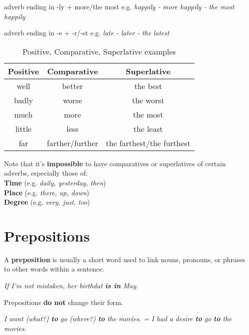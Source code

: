 \documentclass[hidelinks,10pt,a4paper]{article}
\begin{document}
adverb ending in -ly + more/the most
e.g. \textit{happily - more happily - the most happily}

adverb ending in -e + -r/-st
e.g. \textit{late - later - the latest}

\begin{table}[h]
\begin{center}
\begin{tabular}{|c|c|c|}
	\hline
	\textbf{Positive} & \textbf{Comparative} & \textbf{Superlative} \\ \hline
	well & better & the best \\ \hline
	badly & worse & the worst \\ \hline
	much & more & the most \\ \hline
	little & less & the least \\ \hline
	far & farther/further & the farthest/the furthest \\ \hline
\end{tabular}
\end{center}
\caption{Positive, Comparative, Superlative examples} \label{tab:csad2}
\end{table}

Note that it's \textbf{impossible} to have comparatives or superlatives of certain adverbs, especially those of:\\
\indent \textbf{Time} (e.g. \textit{daily, yesterday, then})\\
\indent \textbf{Place} (e.g. \textit{there, up, down})\\
\indent \textbf{Degree} (e.g. \textit{very, just, too})

\section{Prepositions}
A \textbf{preposition} is usually a short word used to link nouns, pronouns, or phrases to other words within a sentence.

\begin{center}
	\textit{If I'm not mistaken, her birthdat \textbf{is in} May. }
\end{center}

Prepositions \textbf{do not} change their form.

\begin{center}
	\textit{I want (what?) \textbf{to} go (where?) \textbf{to} the movies. =
	I had a desire \textbf{to} go \textbf{to} the movies.}
\end{center}
\end{document}
